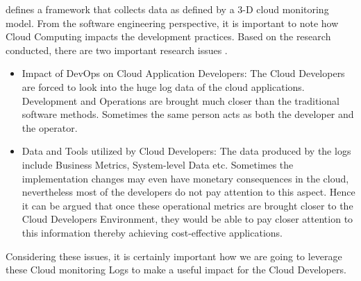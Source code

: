\documentclass[article,type=msc,colorback,12pt,accentcolor=tud7b]{tudthesis}
\begin{document}
\cite{bruneo2015framework} defines a framework that collects data as defined by a 3-D cloud monitoring model. From the software engineering perspective, it is important to note how Cloud Computing impacts the development practices. Based on the research conducted, there are two important research issues \cite{cito2014making}. 

\begin{itemize}

	
	\item Impact of DevOps on Cloud Application Developers:	
	The Cloud Developers are forced to look into the huge log data of the cloud applications. Development and Operations are brought much closer than the traditional software methods. Sometimes the same person acts as both the developer and the operator. 
	
	\item Data and Tools utilized by Cloud Developers:
	The data produced by the logs include Business Metrics, System-level Data etc. Sometimes the implementation changes may even have monetary consequences in the cloud, nevertheless most of the developers do not pay attention to this aspect. Hence it can be argued that once these operational metrics are brought closer to the Cloud Developers Environment, they would be able to pay closer attention to this information thereby achieving cost-effective applications.
	
\end{itemize}

Considering these issues, it is certainly important how we are going to leverage these Cloud monitoring Logs to make a useful impact for the Cloud Developers. 
 
\end{document}
